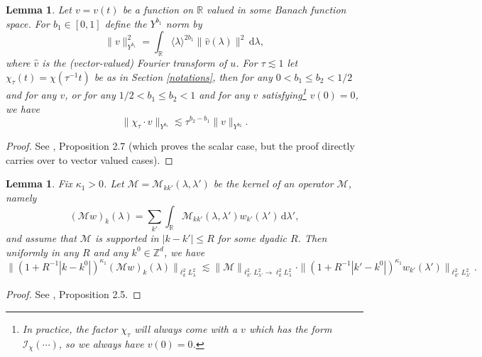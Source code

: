 \documentclass[11 pt,reqno]{amsart}
\newtheorem{lem}[thm]{Lemma}
\theoremstyle{definition}
\theoremstyle{remark}
\numberwithin{equation}{section}
\newcommand{\Ic}{\mathcal{I}}
\newcommand{\Rb}{\mathbb{R}}
\newcommand{\Zb}{\mathbb{Z}}
\newcommand{\Ms}{\mathscr{M}}
\begin{document}
{\begin{lem}\label{localization} Let $v=v(t)$ be a function on $\mathbb{R}$ valued in some Banach function space. For $b_1\in[0,1]$ define the $Y^{b_1}$ norm by
\begin{equation}\|v\|_{Y^{b_1}}^2=\int_{\Rb}\langle \lambda\rangle^{2b_1}\|\widehat{v}(\lambda)\|^2\,\mathrm{d}\lambda,
\end{equation}where $\widehat{v}$ is the (vector-valued) Fourier transform of $u$. For $\tau\lesssim 1$ let $\chi_\tau(t)=\chi(\tau^{-1}t)$ be as in Section \ref{notations}, then for any $0<b_1\leq b_2<1/2$ and for any $v$, or for any $1/2<b_1\leq b_2<1$ and for any $v$ satisfying\footnote{In practice, the factor $\chi_\tau$ will always come with a $v$ which has the form $\Ic_\chi(\cdots)$, so we always have $v(0)=0$.} $v(0)=0$, we have
\begin{equation}\label{localize}\|\chi_\tau\cdot v\|_{Y^{b_1}}\lesssim \tau^{b_2-b_1}\|v\|_{Y^{b_2}}.
\end{equation}
\end{lem}\begin{proof} See \cite{DNY}, Proposition 2.7 (which proves the scalar case, but the proof directly carries over to vector valued cases).
\end{proof}
\begin{lem}\label{weightedbd} Fix $\kappa_1>0$. Let $\Ms=\Ms_{kk'}(\lambda,\lambda')$ be the kernel of an operator $\Ms$, namely
\[(\Ms w)_k(\lambda)=\sum_{k'}\int_{\Rb}\Ms_{kk'}(\lambda,\lambda')w_{k'}(\lambda')\,\mathrm{d}\lambda',\] and assume that $\Ms$ is supported in $|k-k'|\leq R$ for some dyadic $R$. Then uniformly in any $R$ and any $k^0\in\Zb^d$, we have
\begin{equation}\|(1+R^{-1}|k-k^0|)^{\kappa_1}(\Ms w)_k(\lambda)\|_{\ell_k^2L_\lambda^2}\lesssim\|\Ms\|_{\ell_{k'}^2L_{\lambda'}^2\to \ell_k^2L_\lambda^2}\cdot \|(1+R^{-1}|k'-k^0|)^{\kappa_1} w_{k'}(\lambda')\|_{\ell_{k'}^2L_{\lambda'}^2}.
\end{equation}
\end{lem}
\begin{proof} See \cite{DNY}, Proposition 2.5.
\end{proof}
}
\end{document}
